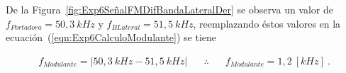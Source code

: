       De la Figura~\ref{fig:Exp6SeñalFMDifBandaLateralDer} se observa un valor de 
      $f_{Portadora}=50,3~kHz$ y $f_{BLateral}=51,5~kHz$, reemplazando éstos valores en 
      la ecuación~(\ref{eqn:Exp6CalculoModulante}) se tiene 

      \begin{align*}
        f_{Modulante}=|50,3~kHz-51,5~kHz| \hspace{20pt} \therefore \hspace{20pt} \boxed{f_{Modulante}=1,2~[kHz]}~.
      \end{align*}
    
